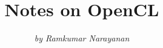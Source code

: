 \documentclass[10pt]{book}
\begin{document}
 
\title{\Huge \bsifamily Notes on OpenCL}
\author{\textit{by Ramkumar Narayanan}}
\date{}
\maketitle 
\tableofcontents
\newpage



\end{document}

